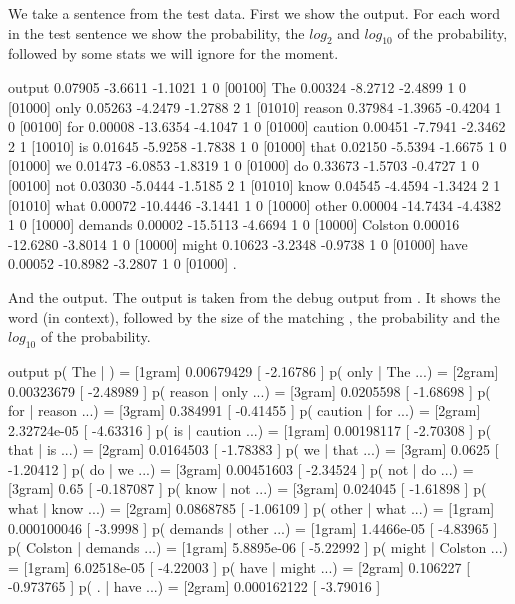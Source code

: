 \documentclass[a4paper,10pt,twoside]{report}
\begin{document}
We take a sentence from the test data. First we show the \wopr{}
output. For each word in the test sentence we show the probability,
the $log_{2}$ and $log_{10}$ of the probability, followed by some
stats we will ignore for the moment.

\begin{wout}{\wopr{} output}
0.07905  -3.6611  -1.1021  1 0 [00100] The
0.00324  -8.2712  -2.4899  1 0 [01000] only
0.05263  -4.2479  -1.2788  2 1 [01010] reason
0.37984  -1.3965  -0.4204  1 0 [00100] for
0.00008 -13.6354  -4.1047  1 0 [01000] caution
0.00451  -7.7941  -2.3462  2 1 [10010] is
0.01645  -5.9258  -1.7838  1 0 [01000] that
0.02150  -5.5394  -1.6675  1 0 [01000] we
0.01473  -6.0853  -1.8319  1 0 [01000] do
0.33673  -1.5703  -0.4727  1 0 [00100] not
0.03030  -5.0444  -1.5185  2 1 [01010] know
0.04545  -4.4594  -1.3424  2 1 [01010] what
0.00072 -10.4446  -3.1441  1 0 [10000] other
0.00004 -14.7434  -4.4382  1 0 [10000] demands
0.00002 -15.5113  -4.6694  1 0 [10000] Colston
0.00016 -12.6280  -3.8014  1 0 [10000] might
0.10623  -3.2348  -0.9738  1 0 [01000] have
0.00052 -10.8982  -3.2807  1 0 [01000] .
\end{wout}

And the \srilm{} output. The output is taken from the debug output from
\srilm{}. It shows the word (in context), followed by the size of the
matching \ngram{}, the probability and the $log_{10}$ of the probability.

\begin{wout}{\srilm{} output}
        p( The |  )               = [1gram] 0.00679429 [ -2.16786 ]
        p( only | The ...)        = [2gram] 0.00323679 [ -2.48989 ]
        p( reason | only ...)     = [3gram] 0.0205598 [ -1.68698 ]
        p( for | reason ...)      = [3gram] 0.384991 [ -0.41455 ]
        p( caution | for ...)     = [2gram] 2.32724e-05 [ -4.63316 ]
        p( is | caution ...)      = [1gram] 0.00198117 [ -2.70308 ]
        p( that | is ...)         = [2gram] 0.0164503 [ -1.78383 ]
        p( we | that ...)         = [3gram] 0.0625 [ -1.20412 ]
        p( do | we ...)           = [3gram] 0.00451603 [ -2.34524 ]
        p( not | do ...)          = [3gram] 0.65 [ -0.187087 ]
        p( know | not ...)        = [3gram] 0.024045 [ -1.61898 ]
        p( what | know ...)       = [2gram] 0.0868785 [ -1.06109 ]
        p( other | what ...)      = [1gram] 0.000100046 [ -3.9998 ]
        p( demands | other ...)   = [1gram] 1.4466e-05 [ -4.83965 ]
        p( Colston | demands ...) = [1gram] 5.8895e-06 [ -5.22992 ]
        p( might | Colston ...)   = [1gram] 6.02518e-05 [ -4.22003 ]
        p( have | might ...)      = [2gram] 0.106227 [ -0.973765 ]
        p( . | have ...)          = [2gram] 0.000162122 [ -3.79016 ]
\end{wout}
\end{document}
